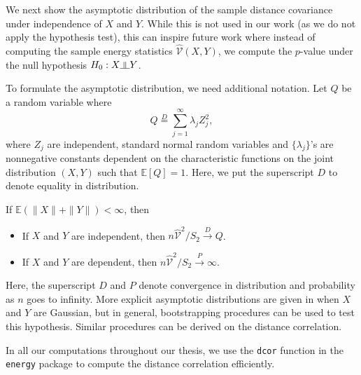 We next show the asymptotic distribution of the sample distance
covariance under independence of $X$ and $Y$. While this is not used in
our work (as we do not apply the hypothesis test), this can inspire
future work where instead of computing the sample energy statistics
$\widehat{\mathcal{V}}(X,Y)$, we compute the $p$-value
under the null hypothesis $H_0: X \indep Y$.

To formulate the asymptotic distribution, we need additional notation.
Let $Q$ be a random variable where
\[ Q \overset{D}{=} \sum_{j=1}^{\infty}\lambda_j Z^2_j, \]
where $Z_j$ are independent, standard normal random variables and
$\{\lambda_j\}$'s are nonnegative constants dependent on the
characteristic functions on the joint distribution $(X,Y)$ such that
$\mathbb{E}[Q] = 1$. Here, we put the superscript $D$ to denote equality 
in distribution.

\begin{prop}
If $\mathbb{E}(\|X\| +\|Y\|)< \infty$, then
\begin{itemize}
\item If $X$ and $Y$ are independent, then $n\widehat{\mathcal{V}}^2/S_2 \overset{D}{\rightarrow} Q$.
\item If $X$ and $Y$ are dependent, then $n\widehat{\mathcal{V}}^2/S_2 \overset{P}{\rightarrow} \infty$.
\end{itemize}
\end{prop}

Here, the superscript $D$ and $P$ denote convergence in distribution and
probability as $n$ goes to infinity. More explicit asymptotic
distributions are given in \cite{szekely2013energy} when $X$ and $Y$ are
Gaussian, but in general, bootstrapping procedures can be used to test
this hypothesis. Similar procedures can be derived on the distance
correlation.

In all our computations throughout our thesis, we use the \texttt{dcor}
function in the \texttt{energy} package to compute the distance
correlation efficiently.
